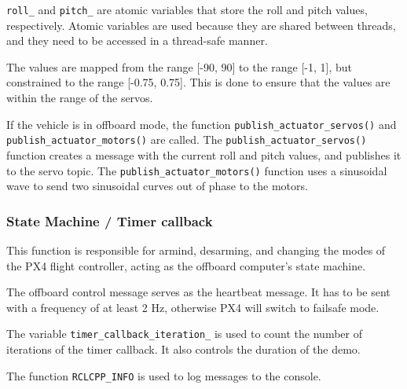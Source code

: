 \documentclass[a4paper]{article}
\begin{document}
\verb|roll_| and \verb|pitch_| are atomic variables that store the roll and pitch values, respectively. 
Atomic variables are used because they are shared between threads, and they need to be accessed in a thread-safe manner. 

The values are mapped from the range [-90, 90] to the range [-1, 1], but constrained to the range [-0.75, 0.75]. 
This is done to ensure that the values are within the range of the servos. 

If the vehicle is in offboard mode, the function \verb|publish_actuator_servos()| and \verb|publish_actuator_motors()| are called.
The \verb|publish_actuator_servos()| function creates a message with the current roll and pitch values, and publishes it to the servo topic.
The \verb|publish_actuator_motors()| function uses a sinusoidal wave to send two sinusoidal curves out of phase to the motors. 

\subsubsection{State Machine / Timer callback}

This function is responsible for armind, desarming, and changing the modes of the PX4 flight controller, acting as the offboard computer's state machine. 

The offboard control message serves as the heartbeat message. It has to be sent with a frequency of at least 2 Hz, otherwise PX4 will switch to failsafe mode.

The variable \verb|timer_callback_iteration_| is used to count the number of iterations of the timer callback. 
It also controls the duration of the demo. 

The function \verb|RCLCPP_INFO| is used to log messages to the console.
\end{document}
